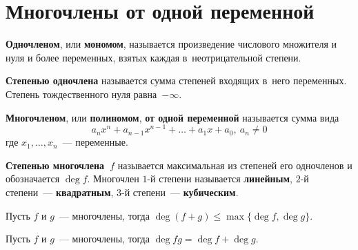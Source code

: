 \section{Многочлены от одной переменной}
  \textbf{Одночленом}, или \textbf{мономом}, называется произведение числового множителя и нуля и более переменных, взятых каждая в~неотрицательной степени.

\textbf{Степенью одночлена} называется сумма степеней входящих в~него переменных.
Степень тождественного нуля равна~$-\infty$.

  \textbf{Многочленом}, или \textbf{полиномом}, \textbf{от одной переменной} называется сумма вида
\begin{equation*}
a_n x^n + a_{n-1} x^{n-1} + \ldots + a_1 x + a_0, \ a_n \neq 0
\end{equation*}
где $x_1, \ldots, x_n$~--- переменные.

 \textbf{Степенью многочлена~$f$} называется максимальная из степеней его одночленов и обозначается $\deg f$.
Многочлен $1$-й степени называется \textbf{линейным}, $2$-й степени~--- \textbf{квадратным}, $3$-й степени~--- \textbf{кубическим}.

\begin{statement}
Пусть $f$ и $g$~--- многочлены, тогда $\deg (f + g) \leqslant \max \{ \deg f, \deg g \}$.
\end{statement}
\begin{statement}
Пусть $f$ и $g$~--- многочлены, тогда $\deg fg = \deg f + \deg g$.
\end{statement}